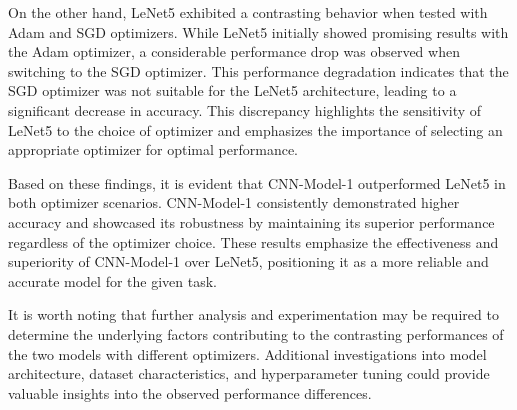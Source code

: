 \clearpage

\noindent On the other hand, LeNet5 exhibited a contrasting behavior when tested with Adam and SGD optimizers. While LeNet5 initially showed promising results with the Adam optimizer, a considerable performance drop was observed when switching to the SGD optimizer. This performance degradation indicates that the SGD optimizer was not suitable for the LeNet5 architecture, leading to a significant decrease in accuracy. This discrepancy highlights the sensitivity of LeNet5 to the choice of optimizer and emphasizes the importance of selecting an appropriate optimizer for optimal performance.

\noindent Based on these findings, it is evident that CNN-Model-1 outperformed LeNet5 in both optimizer scenarios. CNN-Model-1 consistently demonstrated higher accuracy and showcased its robustness by maintaining its superior performance regardless of the optimizer choice. These results emphasize the effectiveness and superiority of CNN-Model-1 over LeNet5, positioning it as a more reliable and accurate model for the given task.

\noindent It is worth noting that further analysis and experimentation may be required to determine the underlying factors contributing to the contrasting performances of the two models with different optimizers. Additional investigations into model architecture, dataset characteristics, and hyperparameter tuning could provide valuable insights into the observed performance differences.

% 